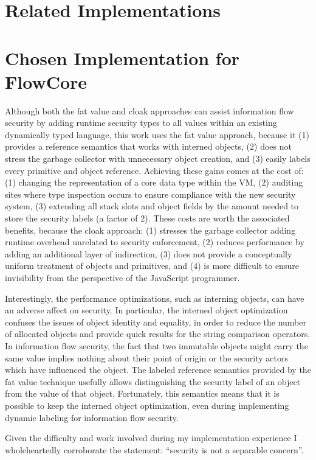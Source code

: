\section{Related Implementations}\label{sec:related-work}


\section{Chosen Implementation for FlowCore}\label{sec:conclusion}

Although both the fat value and cloak approaches can assist information flow security by adding runtime security types to all values within an existing dynamically typed language, this work uses the fat value approach, because it
(1) provides a reference semantics that works with interned objects,
(2) does not stress the garbage collector with unnecessary object creation,
and (3) easily labels every primitive and object reference.
Achieving these gains comes at the cost of:
(1) changing the representation of a core data type within the VM,
(2) auditing sites where type inspection occurs to ensure compliance with the new security system,
(3) extending all stack slots and object fields by the amount needed to store the security labels (a factor of 2).
These costs are worth the associated benefits, because the cloak approach:
(1) stresses the garbage collector adding runtime overhead unrelated to security enforcement,
(2) reduces performance by adding an additional layer of indirection,
(3) does not provide a conceptually uniform treatment of objects and primitives,
and (4) is more difficult to ensure invisibility from the perspective of the JavaScript programmer.

Interestingly, the performance optimizations, such as interning  objects, can have an adverse affect on security.
In particular, the interned object optimization confuses the issues of object identity and equality, in order to reduce the number of allocated objects and provide quick results for the string comparison operators.
In information flow security, the fact that two immutable objects might carry the same value implies nothing about their point of origin or the security actors which have influenced the object.
The labeled reference semantics provided by the fat value technique usefully allows distinguishing the security label of an object from the value of that object.
Fortunately, this semantics means that it is possible to keep the interned object optimization, even during implementing dynamic labeling for information flow security.

Given the difficulty and work involved during my implementation experience I wholeheartedly corroborate the statement: ``security is not a separable concern''\cite{miller2005structure}.



